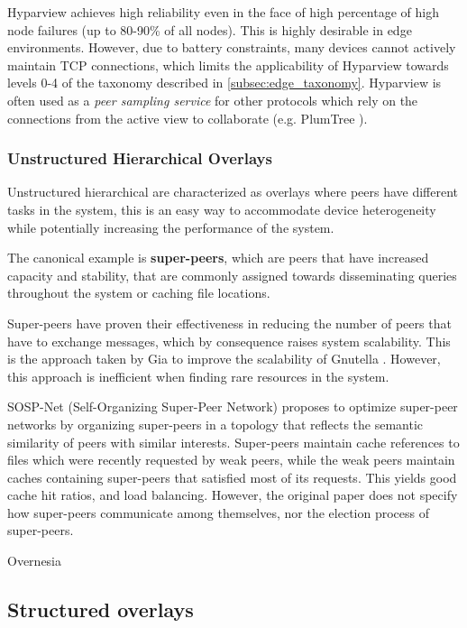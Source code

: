 Hyparview achieves high reliability even in the face of high percentage of high node failures (up to 80-90\% of all nodes). This is highly desirable in edge environments. However, due to battery constraints, many devices cannot actively maintain TCP connections, which limits the applicability of Hyparview towards levels 0-4 of the taxonomy described in \ref{subsec:edge_taxonomy}. Hyparview is often used as a \textit{peer sampling service} for other protocols which rely on the connections from the active view to collaborate (e.g. PlumTree \cite{leitao2007epidemic}).

\subsubsection{Unstructured Hierarchical Overlays}

Unstructured hierarchical are characterized as overlays where peers have different tasks in the system, this is an easy way to accommodate device heterogeneity while potentially increasing the performance of the system. 

The canonical example is \textbf{super-peers}, which are peers that have increased capacity and stability, that are commonly assigned towards disseminating queries throughout the system or caching file locations.

Super-peers have proven their effectiveness in reducing the number of peers that have to exchange messages, which by consequence raises system scalability. This is the approach taken by Gia \cite{Chawathe2003} to improve the scalability of Gnutella \cite{gnutella_gtk}. However, this approach is inefficient when finding rare resources in the system.

SOSP-Net (Self-Organizing Super-Peer Network) \cite{garbacki2007optimizing} proposes to optimize super-peer networks by organizing super-peers in a topology that reflects the semantic similarity of peers with similar interests. Super-peers maintain cache references to files which were recently requested by weak peers, while the weak peers maintain caches containing super-peers that satisfied most of its requests. This yields good cache hit ratios, and load balancing. However, the original paper does not specify how super-peers communicate among themselves, nor the election process of super-peers.

Overnesia \cite{leitao2014overnesia}

\subsection{Structured overlays} 

